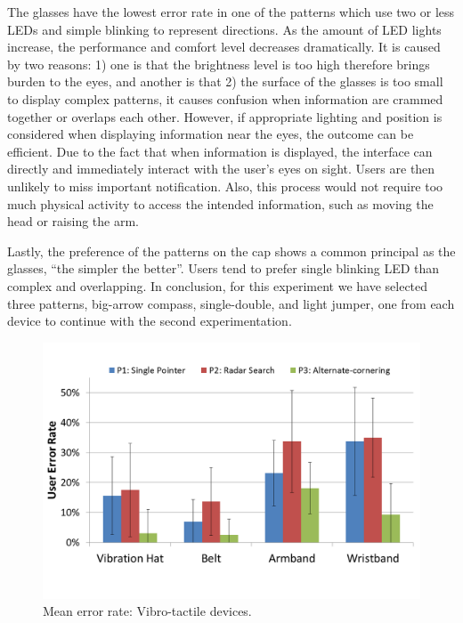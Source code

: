 \documentclass{sigchi}
\begin{document}
The glasses have the lowest error rate in one of the patterns which use two or less LEDs and simple blinking to represent directions. As the amount of LED lights increase, the performance and comfort level decreases dramatically. It is caused by two reasons: 1) one is that the brightness level is too high therefore brings burden to the eyes, and another is that 2) the surface of the glasses is too small to display complex patterns, it causes confusion when information are crammed together or overlaps each other. However, if appropriate lighting and position is considered when displaying information near the eyes, the outcome can be efficient. Due to the fact that when information is displayed, the interface can directly and immediately interact with the user's eyes on sight. Users are then unlikely to miss important notification. Also, this process would not require too much physical activity to access the intended information, such as moving the head or raising the arm.

Lastly, the preference of the patterns on the cap shows a common principal as the glasses, \textquotedblleft the simpler the better\textquotedblright. Users tend to prefer single blinking LED than complex and overlapping. In conclusion, for this experiment we have selected three patterns, big-arrow compass, single-double, and light jumper, one from each device to continue with the second experimentation.

\begin{figure}[!t]
\centering
\includegraphics[width=\columnwidth]{Vibro_ER}
\caption{Mean error rate: Vibro-tactile devices.}
\label{fig:Vibro_ER}
\end{figure}
\end{document}
